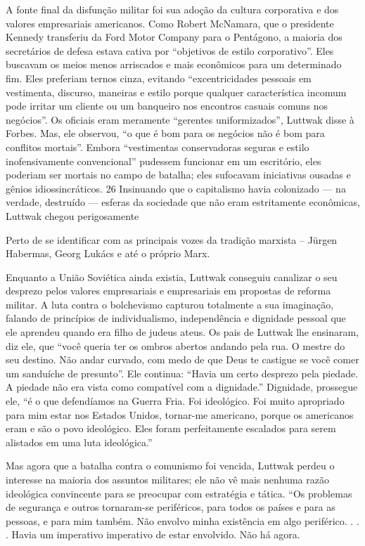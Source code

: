 A fonte final da disfunção militar foi sua adoção da cultura corporativa e dos valores empresariais americanos. Como Robert McNamara, que o presidente Kennedy transferiu da Ford Motor Company para o Pentágono, a maioria dos secretários de defesa estava cativa por “objetivos de estilo corporativo”. Eles buscavam os meios menos arriscados e mais econômicos para um determinado fim. Eles preferiam ternos cinza, evitando “excentricidades pessoais em vestimenta, discurso, maneiras e estilo porque qualquer característica incomum pode irritar um cliente ou um banqueiro nos encontros casuais comuns nos negócios”. Os oficiais eram meramente “gerentes uniformizados”, Luttwak disse à Forbes. Mas, ele observou, “o que é bom para os negócios não é bom para conflitos mortais”. Embora “vestimentas conservadoras seguras e estilo inofensivamente convencional” pudessem funcionar em um escritório, eles poderiam ser mortais no campo de batalha; eles sufocavam iniciativas ousadas e gênios idiossincráticos. {\color{blue}26} Insinuando que o capitalismo havia colonizado — na verdade, destruído — esferas da sociedade que não eram estritamente econômicas, Luttwak chegou perigosamente
 \par 
Perto de se identificar com as principais vozes da tradição marxista – Jürgen Habermas, Georg Lukács e até o próprio Marx.
 \par 
Enquanto a União Soviética ainda existia, Luttwak conseguiu canalizar o seu desprezo pelos valores empresariais e empresariais em propostas de reforma militar. A luta contra o bolchevismo capturou totalmente a sua imaginação, falando de princípios de individualismo, independência e dignidade pessoal que ele aprendeu quando era filho de judeus ateus. Os pais de Luttwak lhe ensinaram, diz ele, que “você queria ter os ombros abertos andando pela rua. O mestre do seu destino. Não andar curvado, com medo de que Deus te castigue se você comer um sanduíche de presunto”. Ele continua: “Havia um certo desprezo pela piedade. A piedade não era vista como compatível com a dignidade.” Dignidade, prossegue ele, “é o que defendíamos na Guerra Fria. Foi ideológico. Foi muito apropriado para mim estar nos Estados Unidos, tornar-me americano, porque os americanos eram e são o povo ideológico. Eles foram perfeitamente escalados para serem alistados em uma luta ideológica.”
 \par 
Mas agora que a batalha contra o comunismo foi vencida, Luttwak perdeu o interesse na maioria dos assuntos militares; ele não vê mais nenhuma razão ideológica convincente para se preocupar com estratégia e tática. “Os problemas de segurança e outros tornaram-se periféricos, para todos os países e para as pessoas, e para mim também. Não envolvo minha existência em algo periférico. . . . Havia um imperativo imperativo de estar envolvido. Não há agora.
